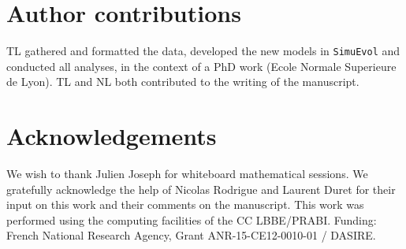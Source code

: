 \documentclass{article}
\begin{document}
\section{Author contributions}
TL gathered and formatted the data, developed the new models in \texttt{SimuEvol} and conducted all analyses, in the context of a PhD work (Ecole Normale Superieure de Lyon).
TL and NL both contributed to the writing of the manuscript.

\section{Acknowledgements}
We wish to thank Julien Joseph for whiteboard mathematical sessions.
We gratefully acknowledge the help of Nicolas Rodrigue and Laurent Duret for their input on this work and their comments on the manuscript.
This work was performed using the computing facilities of the CC LBBE/PRABI.
Funding: French National Research Agency, Grant ANR-15-CE12-0010-01 / DASIRE.


\end{document}
